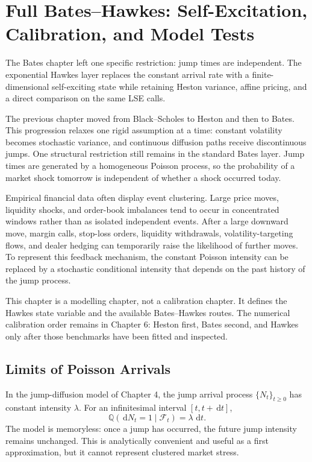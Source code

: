 \documentclass[a4paper,10pt,titlepage,oneside,openany]{book}
\theoremstyle{plain}
\theoremstyle{definition}
\theoremstyle{remark}
\newcommand{\Q}{\mathbb{Q}}
\newcommand{\dd}{\,\mathrm{d}}
\begin{document}
\chapter{Full Bates--Hawkes: Self-Excitation, Calibration, and Model Tests}

The Bates chapter left one specific restriction: jump times are independent. The exponential Hawkes layer replaces the constant arrival rate with a finite-dimensional self-exciting state while retaining Heston variance, affine pricing, and a direct comparison on the same LSE calls.

The previous chapter moved from Black--Scholes to Heston and then to Bates. This progression relaxes one rigid assumption at a time: constant volatility becomes stochastic variance, and continuous diffusion paths receive discontinuous jumps. One structural restriction still remains in the standard Bates layer. Jump times are generated by a homogeneous Poisson process, so the probability of a market shock tomorrow is independent of whether a shock occurred today.

Empirical financial data often display event clustering. Large price moves, liquidity shocks, and order-book imbalances tend to occur in concentrated windows rather than as isolated independent events. After a large downward move, margin calls, stop-loss orders, liquidity withdrawals, volatility-targeting flows, and dealer hedging can temporarily raise the likelihood of further moves. To represent this feedback mechanism, the constant Poisson intensity can be replaced by a stochastic conditional intensity that depends on the past history of the jump process.

This chapter is a modelling chapter, not a calibration chapter. It defines the Hawkes state variable and the available Bates--Hawkes routes. The numerical calibration order remains in Chapter 6: Heston first, Bates second, and Hawkes only after those benchmarks have been fitted and inspected.

\section{Limits of Poisson Arrivals}

In the jump-diffusion model of Chapter 4, the jump arrival process \(\{N_t\}_{t\geq0}\) has constant intensity \(\lambda\). For an infinitesimal interval \([t,t+\dd t]\),
\begin{equation}
    \Q(\dd N_t=1\mid\mathcal{F}_t)=\lambda\,\dd t.
\end{equation}
The model is memoryless: once a jump has occurred, the future jump intensity remains unchanged. This is analytically convenient and useful as a first approximation, but it cannot represent clustered market stress.
\end{document}
